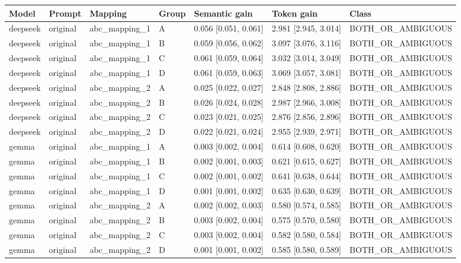 \begin{tabular}{lllllll}
\toprule
Model & Prompt & Mapping & Group & Semantic gain & Token gain & Class \\
\midrule
deepseek & original & abc\_mapping\_1 & A & 0.056 [0.051, 0.061] & 2.981 [2.945, 3.014] & BOTH\_OR\_AMBIGUOUS \\
deepseek & original & abc\_mapping\_1 & B & 0.059 [0.056, 0.062] & 3.097 [3.076, 3.116] & BOTH\_OR\_AMBIGUOUS \\
deepseek & original & abc\_mapping\_1 & C & 0.061 [0.059, 0.064] & 3.032 [3.014, 3.049] & BOTH\_OR\_AMBIGUOUS \\
deepseek & original & abc\_mapping\_1 & D & 0.061 [0.059, 0.063] & 3.069 [3.057, 3.081] & BOTH\_OR\_AMBIGUOUS \\
deepseek & original & abc\_mapping\_2 & A & 0.025 [0.022, 0.027] & 2.848 [2.808, 2.886] & BOTH\_OR\_AMBIGUOUS \\
deepseek & original & abc\_mapping\_2 & B & 0.026 [0.024, 0.028] & 2.987 [2.966, 3.008] & BOTH\_OR\_AMBIGUOUS \\
deepseek & original & abc\_mapping\_2 & C & 0.023 [0.021, 0.025] & 2.876 [2.856, 2.896] & BOTH\_OR\_AMBIGUOUS \\
deepseek & original & abc\_mapping\_2 & D & 0.022 [0.021, 0.024] & 2.955 [2.939, 2.971] & BOTH\_OR\_AMBIGUOUS \\
gemma & original & abc\_mapping\_1 & A & 0.003 [0.002, 0.004] & 0.614 [0.608, 0.620] & BOTH\_OR\_AMBIGUOUS \\
gemma & original & abc\_mapping\_1 & B & 0.002 [0.001, 0.003] & 0.621 [0.615, 0.627] & BOTH\_OR\_AMBIGUOUS \\
gemma & original & abc\_mapping\_1 & C & 0.002 [0.001, 0.002] & 0.641 [0.638, 0.644] & BOTH\_OR\_AMBIGUOUS \\
gemma & original & abc\_mapping\_1 & D & 0.001 [0.001, 0.002] & 0.635 [0.630, 0.639] & BOTH\_OR\_AMBIGUOUS \\
gemma & original & abc\_mapping\_2 & A & 0.002 [0.002, 0.003] & 0.580 [0.574, 0.585] & BOTH\_OR\_AMBIGUOUS \\
gemma & original & abc\_mapping\_2 & B & 0.003 [0.002, 0.004] & 0.575 [0.570, 0.580] & BOTH\_OR\_AMBIGUOUS \\
gemma & original & abc\_mapping\_2 & C & 0.003 [0.002, 0.004] & 0.582 [0.580, 0.584] & BOTH\_OR\_AMBIGUOUS \\
gemma & original & abc\_mapping\_2 & D & 0.001 [0.001, 0.002] & 0.585 [0.580, 0.589] & BOTH\_OR\_AMBIGUOUS \\

\end{tabular}
